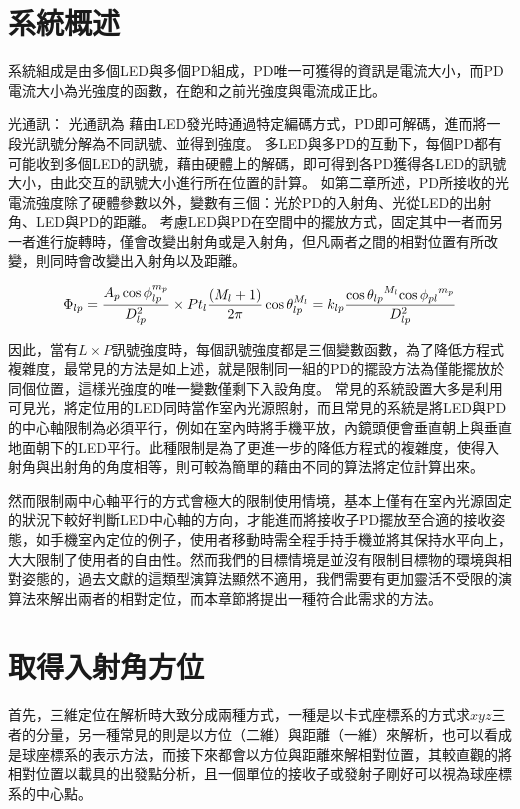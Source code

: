 \section{系統概述}


系統組成是由多個LED與多個PD組成，PD唯一可獲得的資訊是電流大小，而PD電流大小為光強度的函數，在飽和之前光強度與電流成正比。

光通訊：
光通訊為
藉由LED發光時通過特定編碼方式，PD即可解碼，進而將一段光訊號分解為不同訊號、並得到強度。
多LED與多PD的互動下，每個PD都有可能收到多個LED的訊號，藉由硬體上的解碼，即可得到各PD獲得各LED的訊號大小，由此交互的訊號大小進行所在位置的計算。
如第二章所述，PD所接收的光電流強度除了硬體參數以外，變數有三個：光於PD的入射角、光從LED的出射角、LED與PD的距離。
考慮LED與PD在空間中的擺放方式，固定其中一者而另一者進行旋轉時，僅會改變出射角或是入射角，但凡兩者之間的相對位置有所改變，則同時會改變出入射角以及距離。

\begin{equation}
    \Phi_{lp}=\frac{ A_p\cos\phi_{lp}^{m_{p}} }{D^2_{lp}}\times Pt_l\frac{(M_{l}+1)}{2 \pi} \cos \theta_{lp}^{M_{l}}  \\
    =k_{lp}\frac{{\cos\theta_{lp}}^{M_{l}}{\cos\phi_{pl}}^{m_{p}}}{D_{lp}^2}\\
\end{equation}

因此，當有$L\times P$訊號強度時，每個訊號強度都是三個變數函數，為了降低方程式複雜度，最常見的方法是如上述，就是限制同一組的PD的擺設方法為僅能擺放於同個位置，這樣光強度的唯一變數僅剩下入設角度。
常見的系統設置大多是利用可見光，將定位用的LED同時當作室內光源照射，而且常見的系統是將LED與PD的中心軸限制為必須平行，例如在室內時將手機平放，內鏡頭便會垂直朝上與垂直地面朝下的LED平行。此種限制是為了更進一步的降低方程式的複雜度，使得入射角與出射角的角度相等，則可較為簡單的藉由不同的算法將定位計算出來。

然而限制兩中心軸平行的方式會極大的限制使用情境，基本上僅有在室內光源固定的狀況下較好判斷LED中心軸的方向，才能進而將接收子PD擺放至合適的接收姿態，如手機室內定位的例子，使用者移動時需全程手持手機並將其保持水平向上，大大限制了使用者的自由性。然而我們的目標情境是並沒有限制目標物的環境與相對姿態的，過去文獻的這類型演算法顯然不適用，我們需要有更加靈活不受限的演算法來解出兩者的相對定位，而本章節將提出一種符合此需求的方法。

\section{取得入射角方位}

首先，三維定位在解析時大致分成兩種方式，一種是以卡式座標系的方式求$xyz$三者的分量，另一種常見的則是以方位（二維）與距離（一維）來解析，也可以看成是球座標系的表示方法，而接下來都會以方位與距離來解相對位置，其較直觀的將相對位置以載具的出發點分析，且一個單位的接收子或發射子剛好可以視為球座標系的中心點。

